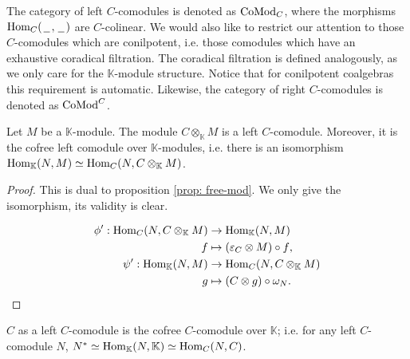 \documentclass[../thesis.tex]{subfiles}
\begin{document}
            The category of left $C$-comodules is denoted as $\tt{CoMod}_C$, where the morphisms $\tt{Hom}_C(\argument,\argument)$ are $C$-colinear. We would also like to restrict our attention to those $C$-comodules which are conilpotent, i.e. those comodules which have an exhaustive coradical filtration. The coradical filtration is defined analogously, as we only care for the $\mathbb{K}$-module structure. Notice that for conilpotent coalgebras this requirement is automatic. Likewise, the category of right $C$-comodules is denoted as $\tt{CoMod}^C$.

            \begin{proposition}\label{prop: cofree-comod}
                Let $M$ be a $\mathbb{K}$-module. The module $C\otimes_{\mathbb{K}}M$ is a left $C$-comodule. Moreover, it is the cofree left comodule over $\mathbb{K}$-modules, i.e. there is an isomorphism $\tt{Hom}_{\mathbb{K}}(N,M)\simeq \tt{Hom}_C(N,C\otimes_{\mathbb{K}}M)$. 
            \end{proposition}

            \begin{proof}
                This is dual to proposition \ref{prop: free-mod}. We only give the isomorphism, its validity is clear.

                \begin{align*}
                    \phi' : \tt{Hom}_C(N,C\otimes_\mathbb{K}M) & \rightarrow \tt{Hom}_\mathbb{K}(N,M) \\
                    f & \mapsto (\varepsilon_C \otimes M) \circ f\tt{,} \\
                    \psi' : \tt{Hom}_\mathbb{K}(N,M) & \rightarrow \tt{Hom}_C(N,C\otimes_\mathbb{K}M) \\
                    g & \mapsto (C \otimes g) \circ \omega_N\tt{.}
                \end{align*}
            \end{proof}

            \begin{corollary}
                $C$ as a left $C$-comodule is the cofree $C$-comodule over $\mathbb{K}$; i.e. for any left $C$-comodule $N$, $N^* \simeq \tt{Hom}_\mathbb{K}(N,\mathbb{K}) \simeq \tt{Hom}_C(N, C)$.
            \end{corollary}
\end{document}
